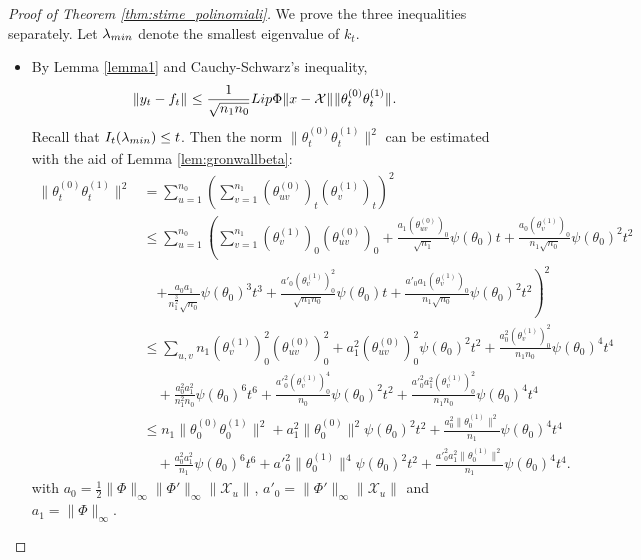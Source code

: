 \documentclass[10pt,a4paper]{amsart}
\newcommand{\X}{\mathcal{X}}
\newcommand{\lammin}{\lambda_{\textup{min}}}
\newcommand{\norm}[2]{
    \|#1\|_{#2}
}
\newcommand{\s}{\psi}
\begin{document}
\begin{proof}[Proof of Theorem \ref{thm:stime_polinomiali}]
    We prove the three inequalities separately.
    Let $\lammin$ denote the smallest eigenvalue of $k_t$.
    \begin{itemize}
        \item By Lemma \ref{lemma1} and Cauchy-Schwarz's inequality,
        \begin{align}
            \label{eqaux_3triangle}
            \norm{y_t- f_t}{} &\le \frac{1}{\sqrt{n_1n_0}} \textup{Lip}\Phi \norm{x-\X}{} \norm{\theta_t^{(0)} \theta_t^{(1)} }{}.
        \end{align}
        Recall that $I_t(\lammin) \le t$.
        Then the norm $\norm{\theta_t^{(0)} \theta_t^{(1)} }{}^2$ can be estimated with the aid of Lemma \ref{lem:gronwallbeta}:
        \begin{align}
            \norm{\theta_t^{(0)} \theta_t^{(1)}}{}^2 &= \sum_{u=1}^{n_0}\left(\sum_{v=1}^{n_1}(\theta^{(0)}_{uv})_t(\theta^{(1)}_v)_t\right)^2 \\
            &\le \sum_{u=1}^{n_0}\left(\sum_{v=1}^{n_1}(\theta_v^{(1)})_0(\theta_{uv}^{(0)})_0 + \frac{a_1(\theta_{uv}^{(0)})_0}{\sqrt{n_1}}\s(\theta_0)t + \frac{a_0(\theta_v^{(1)})_0}{n_1\sqrt{n_0}}\s(\theta_0)^2t^2 \right. \\
            &\quad \left. + \frac{a_0a_1}{n_1^\frac{3}{2}\sqrt{n_0}}\s(\theta_0)^3t^3 + \frac{a'_0(\theta_v^{(1)})^2_0}{\sqrt{n_1n_0}}\s(\theta_0)t + \frac{a'_0a_1(\theta^{(1)}_v)_0}{n_1\sqrt{n_0}}\s(\theta_0)^2t^2\right)^2\\
            &\le \sum_{u,v} n_1(\theta_v^{(1)})_0^2(\theta_{uv}^{(0)})_0^2 +a_1^2(\theta_{uv}^{(0)})^2_0\s(\theta_0)^2t^2 + \frac{a_0^2(\theta_v^{(1)})^2_0}{n_1n_0}\s(\theta_0)^4t^4 \\
            &\quad + \frac{a_0^2a_1^2}{n_1^2n_0}\s(\theta_0)^6t^6 + \frac{{a'}^2_0(\theta_v^{(1)})^4_0}{n_0}\s(\theta_0)^2t^2 + \frac{{a'}^2_0a_1^2(\theta^{(1)}_v)^2_0}{n_1n_0}\s(\theta_0)^4t^4 \\
            &\le n_1\norm{\theta^{(0)}_0\theta^{(1)}_0}{}^2 +a_1^2\norm{\theta^{(0)}_0}{}^2\s(\theta_0)^2t^2 + \frac{a_0^2\norm{\theta^{(1)}_0}{}^2}{n_1}\s(\theta_0)^4t^4 \\
            &\quad + \frac{a_0^2a_1^2}{n_1}\s(\theta_0)^6t^6 + {a'}^2_0\norm{\theta^{(1)}_0}{}^4\s(\theta_0)^2t^2 + \frac{{a'}^2_0a_1^2\norm{\theta^{(1)}_0}{}^2}{n_1}\s(\theta_0)^4t^4.
        \end{align}
        with $a_0 = \frac{1}{2}\norm{\Phi}{\infty}\norm{\Phi'}{\infty}\norm{\X_u}{}$, $a'_0 = \norm{\Phi'}{\infty}\norm{\X_u}{}$ and $a_1 = \norm{\Phi}{\infty}$.


\end{itemize}
\end{proof}
\end{document}
